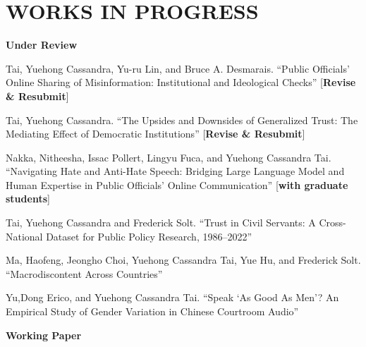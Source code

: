 \documentclass[10.5pt,]{article}
\providecommand{\tightlist}{%
	\setlength{\itemsep}{0pt}\setlength{\parskip}{0pt}}
\renewenvironment{itemize}{
	\begin{list}{}{
			\setlength{\leftmargin}{1.5em}
		}
	}{
	\end{list}
}
\begin{document}
\section{WORKS IN PROGRESS}\label{works-in-progress}

\begin{itemize}
\tightlist
\item
  \textbf{Under Review}

  \begin{itemize}
  \tightlist
  \item
    Tai, Yuehong Cassandra, Yu-ru Lin, and Bruce A. Desmarais. ``Public
    Oﬀicials' Online Sharing of Misinformation: Institutional and
    Ideological Checks'' {[}\textbf{Revise \& Resubmit}{]}
  \item
    Tai, Yuehong Cassandra. ``The Upsides and Downsides of Generalized
    Trust: The Mediating Effect of Democratic Institutions''
    {[}\textbf{Revise \& Resubmit}{]}
  \item
    Nakka, Nitheesha, Issac Pollert, Lingyu Fuca, and Yuehong Cassandra
    Tai. ``Navigating Hate and Anti-Hate Speech: Bridging Large Language
    Model and Human Expertise in Public Oﬀicials' Online Communication''
    {[}\textbf{with graduate students}{]}
  \item
    Tai, Yuehong Cassandra and Frederick Solt. ``Trust in Civil
    Servants: A Cross-National Dataset for Public Policy Research,
    1986--2022''
  \item
    Ma, Haofeng, Jeongho Choi, Yuehong Cassandra Tai, Yue Hu, and
    Frederick Solt. ``Macrodiscontent Across Countries''
  \item
    Yu,Dong Erico, and Yuehong Cassandra Tai. ``Speak `As Good As Men'?
    An Empirical Study of Gender Variation in Chinese Courtroom Audio''
  \end{itemize}
\item
  \textbf{Working Paper}


\end{itemize}
\end{document}
